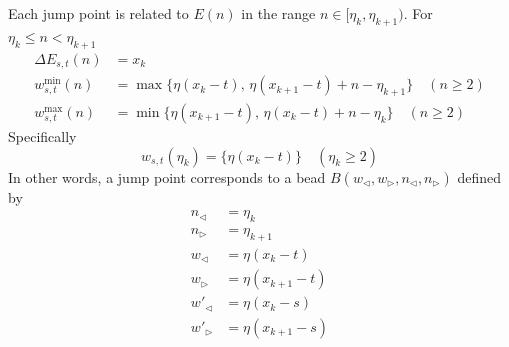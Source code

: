 \documentclass[]{article}
\begin{document}
\vspace{1cm}
\begin{lemma}[Joint]
	 Each jump point is related to $E(n)$ in the range $n \in [\eta_k, \eta_{k+1})$. For $\eta_k \le n < \eta_{k+1}$
	\begin{align*}
	\Delta E_{s,t}(n) &= x_k\\
	w^{\min}_{s,t}(n) &= \max\{\eta(x_k-t),\, \eta(x_{k+1}-t) + n -\eta_{k+1}\}\quad(n\geq 2)	\\
	w^{\max}_{s,t}(n) &= \min\{\eta(x_{k+1}-t),\,\eta(x_k-t) + n -\eta_k \} \quad(n\geq 2)
	\end{align*}
	Specifically
	\[
	w_{s,t}(\eta_k) = \{\eta(x_k-t)\}\quad(\eta_k\geq 2)
	\]
	In other words, a jump point corresponds to a bead $B(w_{\triangleleft}, w_{\triangleright}, n_{\triangleleft},n_{\triangleright})$ defined by
	\begin{align*}
	n_{\triangleleft} &= \eta_k\\
	n_{\triangleright} &= \eta_{k+1}\\
	w_{\triangleleft} &= \eta(x_k - t)\\
	w_{\triangleright} &= \eta(x_{k+1} - t)\\
	w'_{\triangleleft} &= \eta(x_k - s)\\
	w'_{\triangleright} &= \eta(x_{k+1} - s)
	\end{align*}
\end{lemma}
\end{document}
